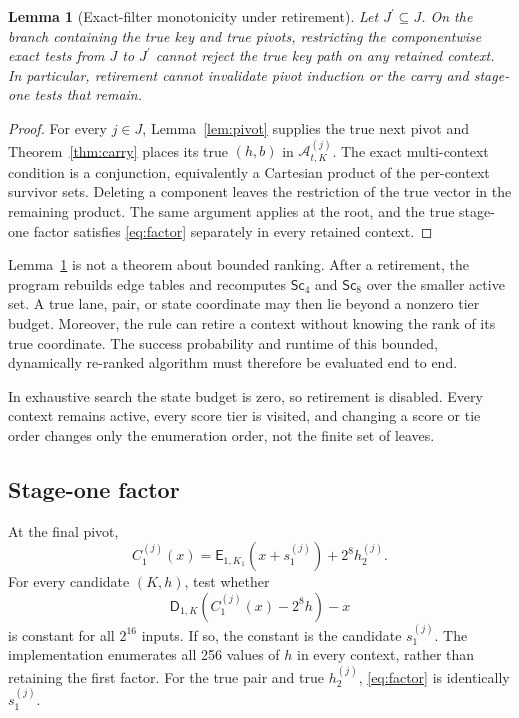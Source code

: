 \documentclass[10pt]{article}
\theoremstyle{plain}
\newtheorem{lemma}[theorem]{Lemma}
\theoremstyle{definition}
\theoremstyle{remark}
\newcommand{\E}{\mathsf E}
\newcommand{\D}{\mathsf D}
\begin{document}
\begin{lemma}[Exact-filter monotonicity under retirement]
\label{lem:retirement}
Let \(J^{\prime}\subseteq J\).  On the branch containing the true key and true
pivots, restricting the componentwise exact tests from \(J\) to
\(J^{\prime}\) cannot reject the true key path on any retained context.  In
particular, retirement cannot invalidate pivot induction or the carry and
stage-one tests that remain.
\end{lemma}
\begin{proof}
For every \(j\in J\), Lemma~\ref{lem:pivot} supplies the true next pivot and
Theorem~\ref{thm:carry} places its true \((h,b)\) in
\(\mathcal A_{t,K}^{(j)}\).  The exact multi-context condition is a conjunction,
equivalently a Cartesian product of the per-context survivor sets.  Deleting a
component leaves the restriction of the true vector in the remaining product.
The same argument applies at the root, and the true stage-one factor satisfies
\eqref{eq:factor} separately in every retained context.
\end{proof}

Lemma~\ref{lem:retirement} is not a theorem about bounded ranking.  After a
retirement, the program rebuilds edge tables and recomputes
\(\mathsf{Sc}_4\) and \(\mathsf{Sc}_8\) over the smaller active set.  A true lane,
pair, or state coordinate may then lie beyond a nonzero tier budget.  Moreover,
the rule can retire a context without knowing the rank of its true coordinate.
The success probability and runtime of this bounded, dynamically re-ranked
algorithm must therefore be evaluated end to end.

In exhaustive search the state budget is zero, so retirement is disabled.
Every context remains active, every score tier is visited, and changing a
score or tie order changes only the enumeration order, not the finite set of
leaves.

\subsection{Stage-one factor}

At the final pivot,
\begin{equation}
C_1^{(j)}(x)=\E_{1,K_1}(x+s_1^{(j)})+2^8h_2^{(j)}.
\end{equation}
For every candidate \((K,h)\), test whether
\begin{equation}
\D_{1,K}(C_1^{(j)}(x)-2^8h)-x
\label{eq:factor}
\end{equation}
is constant for all \(2^{16}\) inputs.  If so, the constant is the candidate
\(s_1^{(j)}\).  The implementation enumerates all 256 values of \(h\) in
every context, rather than retaining the first factor.  For the true pair and
true \(h_2^{(j)}\), \eqref{eq:factor} is identically \(s_1^{(j)}\).
\end{document}
